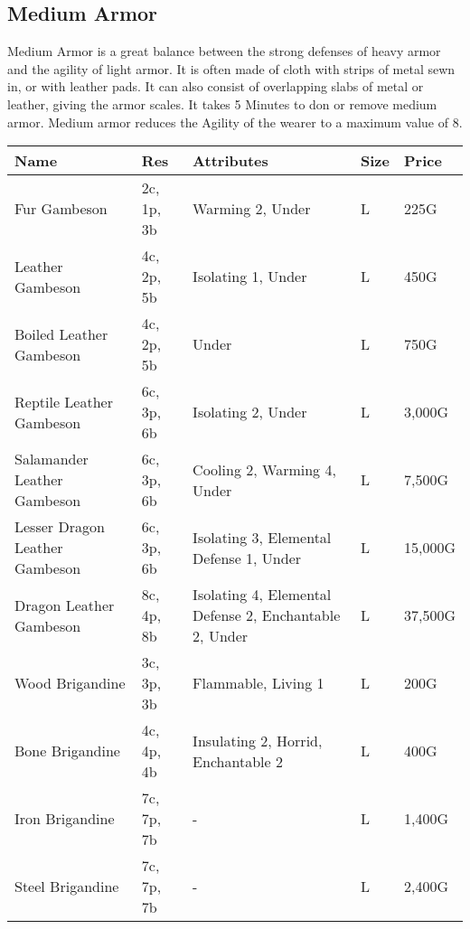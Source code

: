 \subsection{Medium Armor}

Medium Armor is a great balance between the strong defenses of heavy armor and the agility of light armor. It is often made of cloth with strips of metal sewn in, or with leather pads. It can also consist of overlapping slabs of metal or leather, giving the armor scales. It takes 5 Minutes to don or remove medium armor. Medium armor reduces the Agility of the wearer to a maximum value of 8.

\begin{longtable}{p{3.5cm} | p{1.5cm} | p{5cm} | p{1cm} | p{1.25cm}}
	Name & Res & Attributes & Size & Price\\ \hline
	
	Fur Gambeson & 2c, 1p, 3b & Warming 2, Under & L & 225G\\
	
	Leather Gambeson & 4c, 2p, 5b & Isolating 1, Under & L & 450G\\
	
	Boiled Leather Gambeson & 4c, 2p, 5b & Under & L & 750G\\
	
	Reptile Leather Gambeson & 6c, 3p, 6b & Isolating 2, Under & L & 3,000G\\
	
	Salamander Leather Gambeson & 6c, 3p, 6b & Cooling 2, Warming 4, Under & L & 7,500G\\
	
	Lesser Dragon Leather Gambeson & 6c, 3p, 6b & Isolating 3, Elemental Defense 1, Under & L & 15,000G\\
	
	Dragon Leather Gambeson & 8c, 4p, 8b & Isolating 4, Elemental Defense 2, Enchantable 2, Under & L & 37,500G\\
	
	Wood Brigandine & 3c, 3p, 3b & Flammable, Living 1 & L & 200G\\
	
	Bone Brigandine & 4c, 4p, 4b & Insulating 2, Horrid, Enchantable 2 & L & 400G\\
	
	Iron Brigandine & 7c, 7p, 7b & - & L & 1,400G\\
	
	Steel Brigandine & 7c, 7p, 7b & - & L & 2,400G\\
	

\end{longtable}
